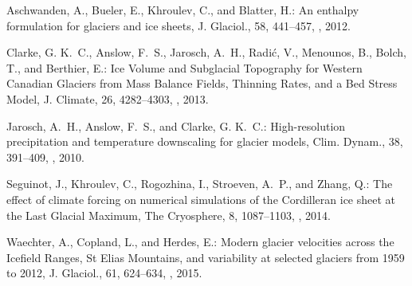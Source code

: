 \documentclass[10pt]{article}
\begin{document}









\begin{thebibliography}{69}

Aschwanden, A., Bueler, E., Khroulev, C., and Blatter, H.: An enthalpy
  formulation for glaciers and ice sheets, J. Glaciol., 58, 441--457,
  , 2012.

Clarke, G. K.~C., Anslow, F.~S., Jarosch, A.~H., Radi{\'{c}}, V., Menounos, B.,
  Bolch, T., and Berthier, E.: Ice Volume and Subglacial Topography for Western
  Canadian Glaciers from Mass Balance Fields, Thinning Rates, and a Bed Stress
  Model, J. Climate, 26, 4282--4303, , 2013.

Jarosch, A.~H., Anslow, F.~S., and Clarke, G. K.~C.: High-resolution
  precipitation and temperature downscaling for glacier models, Clim. Dynam.,
  38, 391--409, , 2010.

Seguinot, J., Khroulev, C., Rogozhina, I., Stroeven, A.~P., and Zhang, Q.: The
  effect of climate forcing on numerical simulations of the {C}ordilleran ice
  sheet at the {L}ast {G}lacial {M}aximum, The Cryosphere, 8, 1087--1103,
  , 2014.

Waechter, A., Copland, L., and Herdes, E.: Modern glacier velocities across the
  Icefield Ranges, St Elias Mountains, and variability at selected glaciers
  from 1959 to 2012, J. Glaciol., 61, 624--634, ,
  2015.

\end{thebibliography}

\end{document}
